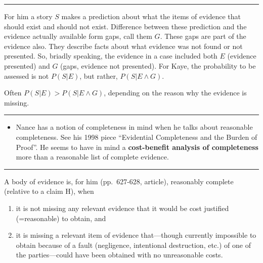 \documentclass[
  10pt,
  dvipsnames,enabledeprecatedfontcommands]{scrartcl}
\providecommand{\tightlist}{%
  \setlength{\itemsep}{0pt}\setlength{\parskip}{0pt}}
\begin{document}
\begin{center}\rule{0.5\linewidth}{0.5pt}\end{center}

For him a story \(S\) makes a prediction about what the items of
evidence that should exist and should not exist. Difference between
these prediction and the evidence actually available form gaps, call
them \(G\). These gaps are part of the evidence also. They describe
facts about what evidence was not found or not presented. So, briadly
speaking, the evidence in a case included both \(E\) (evidence
presented) and \(G\) (gaps, evidence not presented). For Kaye, the
probability to be assessed is not \(P(S \vert E)\), but rather,
\(P(S \vert E \wedge G)\).

Often \(P(S \vert E) > P(S \vert E \wedge G)\), depending on the reason
why the evidence is missing.


\begin{center}\rule{0.5\linewidth}{0.5pt}\end{center}

\begin{itemize}
\tightlist
\item
  Nance has a notion of completeness in mind when he talks about
  reasonable completeness. See his 1998 piece ``Evidential Completeness
  and the Burden of Proof''. He seems to have in mind a
  \textbf{cost-benefit analysis of completeness} more than a reasonable
  list of complete evidence.
\end{itemize}

\begin{center}\rule{0.5\linewidth}{0.5pt}\end{center}

A body of evidence is, for him (pp.~627-628, article), reasonably
complete (relative to a claim H), when

\begin{enumerate}
\def\labelenumi{(\alph{enumi})}
\item
  it is not missing any relevant evidence that it would be cost
  justified (=reasonable) to obtain, and
\item
  it is missing a relevant item of evidence that---though currently
  impossible to obtain because of a fault (negligence, intentional
  destruction, etc.) of one of the parties---could have been obtained
  with no unreasonable costs.
\end{enumerate}
\end{document}
